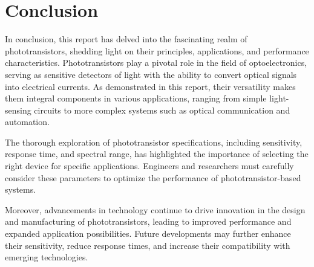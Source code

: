 \pagebreak
\section{Conclusion}
In conclusion, this report has delved into the fascinating realm of phototransistors, shedding light on their principles, applications, and performance characteristics.
Phototransistors play a pivotal role in the field of optoelectronics, serving as sensitive detectors of light with the ability to convert optical signals
into electrical currents.
As demonstrated in this report, their versatility makes them integral components in various applications, ranging from simple light-sensing circuits
to more complex systems such as optical communication and automation.

The thorough exploration of phototransistor specifications, including sensitivity, response time, and spectral range, has highlighted the importance
of selecting the right device for specific applications. Engineers and researchers must carefully consider these parameters to optimize the
performance of phototransistor-based systems.

Moreover, advancements in technology continue to drive innovation in the design and manufacturing of phototransistors, leading to improved performance
and expanded application possibilities. Future developments may further enhance their sensitivity, reduce response times, and increase their
compatibility with emerging technologies.